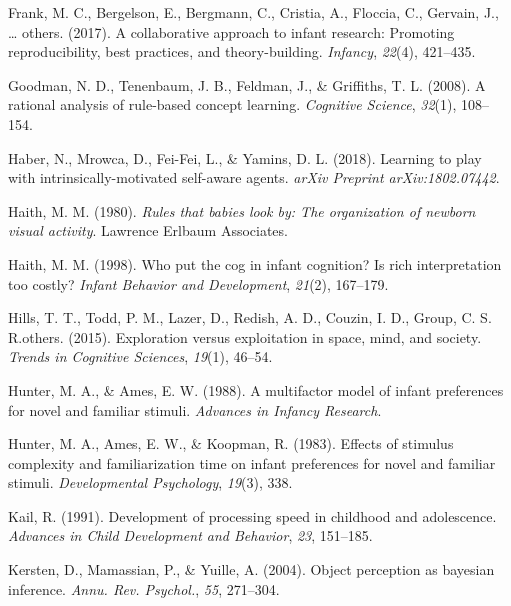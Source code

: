 \documentclass[10pt, letterpaper]{article}
\newenvironment{CSLReferences}%
  {}%
  {\par}
\begin{document}
\begin{CSLReferences}
\leavevmode{}%
Frank, M. C., Bergelson, E., Bergmann, C., Cristia, A., Floccia, C.,
Gervain, J., \ldots{} others. (2017). A collaborative approach to infant
research: Promoting reproducibility, best practices, and
theory-building. \emph{Infancy}, \emph{22}(4), 421--435.

\leavevmode{}%
Goodman, N. D., Tenenbaum, J. B., Feldman, J., \& Griffiths, T. L.
(2008). A rational analysis of rule-based concept learning.
\emph{Cognitive Science}, \emph{32}(1), 108--154.

\leavevmode{}%
Haber, N., Mrowca, D., Fei-Fei, L., \& Yamins, D. L. (2018). Learning to
play with intrinsically-motivated self-aware agents. \emph{arXiv
Preprint arXiv:1802.07442}.

\leavevmode{}%
Haith, M. M. (1980). \emph{Rules that babies look by: The organization
of newborn visual activity}. Lawrence Erlbaum Associates.

\leavevmode{}%
Haith, M. M. (1998). Who put the cog in infant cognition? Is rich
interpretation too costly? \emph{Infant Behavior and Development},
\emph{21}(2), 167--179.

\leavevmode{}%
Hills, T. T., Todd, P. M., Lazer, D., Redish, A. D., Couzin, I. D.,
Group, C. S. R.others. (2015). Exploration versus exploitation in space,
mind, and society. \emph{Trends in Cognitive Sciences}, \emph{19}(1),
46--54.

\leavevmode{}%
Hunter, M. A., \& Ames, E. W. (1988). A multifactor model of infant
preferences for novel and familiar stimuli. \emph{Advances in Infancy
Research}.

\leavevmode{}%
Hunter, M. A., Ames, E. W., \& Koopman, R. (1983). Effects of stimulus
complexity and familiarization time on infant preferences for novel and
familiar stimuli. \emph{Developmental Psychology}, \emph{19}(3), 338.

\leavevmode{}%
Kail, R. (1991). Development of processing speed in childhood and
adolescence. \emph{Advances in Child Development and Behavior},
\emph{23}, 151--185.

\leavevmode{}%
Kersten, D., Mamassian, P., \& Yuille, A. (2004). Object perception as
bayesian inference. \emph{Annu. Rev. Psychol.}, \emph{55}, 271--304.


\end{CSLReferences}
\end{document}
